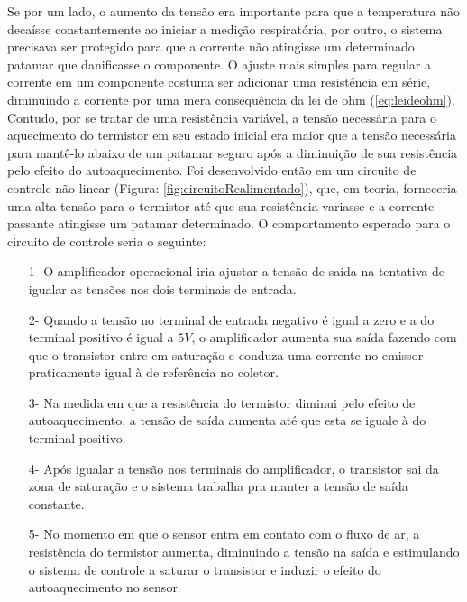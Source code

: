 Se por um lado, o aumento da tensão era importante para que a temperatura não decaísse constantemente ao iniciar a medição respiratória, por outro, o sistema precisava ser protegido para que a corrente não atingisse um determinado patamar que danificasse o componente. O ajuste mais simples para regular a corrente em um componente costuma ser adicionar uma resistência em série, diminuindo a corrente por uma mera consequência da lei de ohm (\ref{eq:leideohm}). Contudo, por se tratar de uma resistência variável, a tensão necessária para o aquecimento do termistor em seu estado inicial era maior que a tensão necessária para mantê-lo abaixo de um patamar seguro após a diminuição de sua resistência pelo efeito do autoaquecimento. Foi desenvolvido então em um circuito de controle não linear (Figura: \ref{fig:circuitoRealimentado}), que, em teoria, forneceria uma alta tensão para o termistor até que sua resistência variasse e a corrente passante atingisse um patamar determinado. O comportamento esperado para o circuito de controle seria o seguinte: 

\begin{itemize}
	\item [1-] O amplificador operacional iria ajustar a tensão de saída na tentativa de igualar as tensões nos dois terminais de entrada.
	\item [2-] Quando a tensão no terminal de entrada negativo é igual a zero e a do terminal positivo é igual a $5V$, o amplificador aumenta sua saída fazendo com que o transistor entre em saturação e conduza uma corrente no emissor praticamente igual à de referência no coletor.
	\item [3-] Na medida em que a resistência do termistor diminui pelo efeito de autoaquecimento, a tensão de saída aumenta até que esta se iguale à do terminal positivo.
	\item [4-] Após igualar a tensão nos terminais do amplificador, o transistor sai da zona de saturação e o sistema trabalha pra manter a tensão de saída constante.
	\item [5-] No momento em que o sensor entra em contato com o fluxo de ar, a resistência do termistor aumenta, diminuindo a tensão na saída e estimulando o sistema de controle a saturar o transistor e induzir o efeito do autoaquecimento no sensor. 
\end{itemize}

